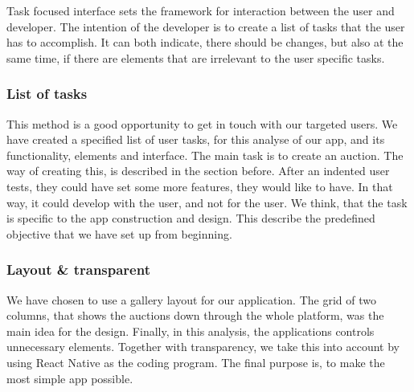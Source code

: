 Task focused interface sets the framework for interaction between the user and developer. The intention of the developer is to create a list of tasks that the user has to accomplish. It can both indicate, there should be changes, but also at the same time, if there are elements that are irrelevant to the user specific tasks.

\subsubsection*{List of tasks}
This method is a good opportunity to get in touch with our targeted users. We have created a specified list of user tasks, for this analyse of our app, and its functionality, elements and interface. The main task is to create an auction. The way of creating this, is described in the section before. After an indented user tests, they could have set some more features, they would like to have. In that way, it could develop with the user, and not for the user. 
We think, that the task is specific to the app construction and design. This describe the predefined objective that we have set up from beginning.

\subsubsection*{Layout \& transparent}
We have chosen to use a gallery layout for our application. The grid of two columns, that shows the auctions down through the whole platform, was the main idea for the design. 
Finally, in this analysis, the applications controls unnecessary elements. Together with transparency, we take this into account by using React Native as the coding program. The final purpose is, to make the most simple app possible.

